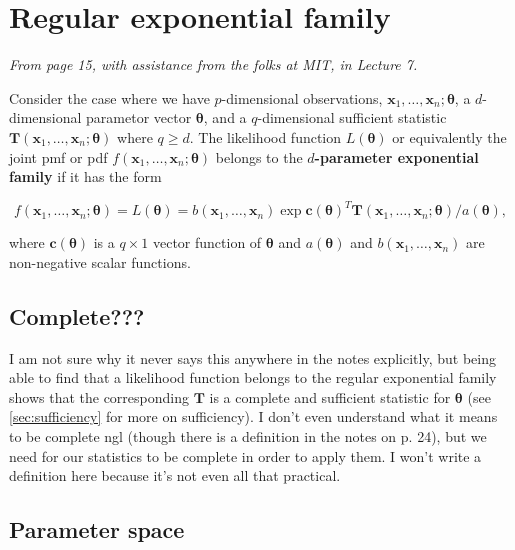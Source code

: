 \section{Regular exponential family}\label{sec:reg exp fam}

\textit{From page 15, with assistance from the folks at MIT, \autocite{MIT} in Lecture 7.}

Consider the case where we have \(p\)-dimensional observations, \(\bm{x}_1,\ldots,\bm{x}_n;\bm{\theta}\), 
a \(d\)-dimensional parametor vector \(\bm{\theta}\), 
and a \(q\)-dimensional sufficient statistic \(\bm{T}(\bm{x}_1,\ldots,\bm{x}_n;\bm{\theta})\) where \(q\geq d\). 
The likelihood function \(L(\bm{\theta})\) or equivalently the joint 
pmf or pdf \(f(\bm{x}_1,\ldots,\bm{x}_n;\bm{\theta})\) belongs to the 
\textbf{\(d\)-parameter exponential family} if it has the form

\begin{equation}\label{eq:exp family}
    f(\bm{x}_1,\ldots,\bm{x}_n;\bm{\theta}) = L(\bm{\theta}) = b(\bm{x}_1,\ldots,\bm{x}_n)\exp{\bm{c}{(\bm{\theta})}^T \bm{T}(\bm{x}_1,\ldots,\bm{x}_n;\bm{\theta})/a(\bm{\theta})},
\end{equation}

where \(\bm{c}(\bm{\theta})\) is a \(q\times 1\) vector function of \(\bm{\theta}\) and \(a(\bm{\theta})\) and \(b(\bm{x}_1,\ldots,\bm{x}_n)\) 
are non-negative scalar functions. 


\subsection{Complete???}\label{sec:complete}

I am not sure why it never says this anywhere in the notes explicitly, but being able to find that a likelihood function belongs to the regular exponential family shows that the corresponding \(\bm{T}\) is a complete and sufficient statistic for \(\bm{\theta}\) (see \cref{sec:sufficiency} for more on sufficiency). 
I don't even understand what it means to be complete ngl (though there is a definition in the notes on p. 24), but we need for our statistics to be complete in order to apply them. 
I won't write a definition here because it's not even all that practical. 

\subsection{Parameter space}\label{sec:param space}

